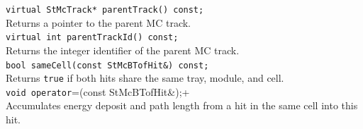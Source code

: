 \begin{Entry}
    \verb+virtual StMcTrack* parentTrack() const;+\\
    Returns a pointer to the parent MC track.\\

    \verb+virtual int parentTrackId() const;+\\
    Returns the integer identifier of the parent MC track.\\

    \verb+bool sameCell(const StMcBTofHit&) const;+\\
    Returns \texttt{true} if both hits share the same tray, module,
    and cell.\\

    \verb+void operator+=(const StMcBTofHit&);+\\
    Accumulates energy deposit and path length from a hit in the
    same cell into this hit.

\end{Entry}
\clearpage

%
%
